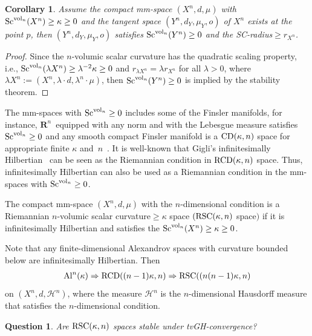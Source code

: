 \documentclass[10pt,a4paper]{amsart}
\newtheorem{Question}[Theorem]{Question}
\newtheorem{Corollary}[Theorem]{Corollary}
\begin{document}
\begin{Corollary}Assume the compact mm-space $(X^n,d,\mu)$ with ${\rm Sc}^{{\rm vol}_n}(X^n)\geq\kappa\geq 0$ and the tangent space $(Y^n,d_Y,\mu_Y, o)$ of $X^n$ exists at the point $p$, then $(Y^n,d_Y,\mu_Y, o)$ satisfies ${\rm Sc}^{{\rm vol}_n}(Y^n)\allowbreak\geq 0$ and the SC-radius$\geq r_{X^n}$.
\end{Corollary}

\begin{proof}
Since the $n$-volumic scalar curvature has the quadratic scaling property, i.e., ${\rm Sc}^{{\rm vol}_n}(\lambda X^n)\allowbreak \geq \lambda ^{-2}\kappa \geq 0$ and $r_{\lambda X^n}=\lambda r_{X^n}$ for all $\lambda>0$, where $\lambda X^n:=(X^n, \lambda \cdot d,\lambda^n \cdot \mu)$, then ${\rm Sc}^{{\rm vol}_n}(Y^n)\geq 0$ is implied by the stability theorem.
\end{proof}

The mm-spaces with ${\rm Sc}^{{\rm vol}_n}\geq 0$ includes some of the Finsler manifolds, for instance, $\mathbf{R}^n$~equip\-ped with any norm and with the Lebesgue measure satisfies ${\rm Sc}^{{\rm vol}_n}\geq 0$ and any smooth compact Finsler manifold is a ${\rm CD}(\kappa, n)$ space for appropriate finite $\kappa$ and~$n$~\cite{MR2546027}. It is well-known that Gigli's infinitesimally Hilbertian~\cite{MR3381131} can be seen as the Riemannian condition in ${\rm RCD}(\kappa, n)$ space. Thus, infinitesimally Hilbertian can also be used as a Riemannian condition in the mm-spaces with ${\rm Sc}^{{\rm vol}_n}\geq 0$.

\begin{Definition}
The compact mm-space $(X^n,d,\mu)$ with the $n$-dimensional condition is a Riemannian $n$-volumic scalar curvature$\geq\kappa$ space $({\rm RSC}(\kappa, n)$ space$)$ if it is infinitesimally Hilbertian and satisfies the ${\rm Sc}^{{\rm vol}_n}(X^n)\geq\kappa\geq 0$.
\end{Definition}

Note that any finite-dimensional Alexandrov spaces with curvature bounded below are infinitesimally Hilbertian. Then
\begin{gather*}
{\rm Al}^n(\kappa)\Rightarrow {\rm RCD}((n-1)\kappa, n)\Rightarrow {\rm RSC}((n(n-1)\kappa, n)
\end{gather*}
 on $(X^n,d,\mathcal{H}^n)$, where the measure $\mathcal{H}^n$ is the $n$-dimensional Hausdorff measure that satisfies the $n$-dimensional condition.

\begin{Question} Are ${\rm RSC}(\kappa, n)$ spaces stable under tvGH-convergence?
\end{Question}
\end{document}
